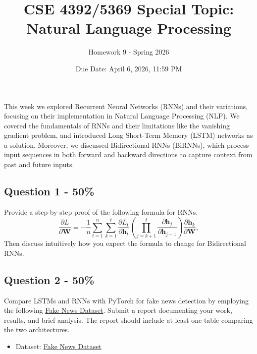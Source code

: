 \documentclass{article}
\begin{document}
\title{CSE 4392/5369 Special Topic: Natural Language Processing}
\author{Homework 9 - Spring 2026}
\date{Due Date: April 6, 2026, 11:59 PM}
\maketitle
\thispagestyle{fancy}


This week we explored Recurrent Neural Networks (RNNs) and their variations, focusing on their implementation in Natural Language Processing (NLP). We covered the fundamentals of RNNs and their limitations like the vanishing gradient problem, and introduced Long Short-Term Memory (LSTM) networks as a solution. Moreover, we discussed Bidirectional RNNs (BiRNNs), which process input sequences in both forward and backward directions to capture context from past and future inputs.

\subsection*{Question 1 - 50\%}
Provide a step-by-step proof of the following formula for RNNs.
$$\frac{\partial L }{\partial \mathbf{W}} = -\frac{1}{n}\sum_{t=1}^{n}\sum_{k=1}^{t}  \frac{\partial L_t }{\partial  \mathbf{h}_t}\left ( \prod_{j=k+1}^{t}  \frac{\partial \mathbf{h}_j  }{\partial  \mathbf{h}_{j-1}} \right ) \frac{\partial \mathbf{h}_k }{\partial \mathbf{W}},$$
Then discuss intuitively how you expect the formula to change for Bidirectional RNNs. 


\subsection*{Question 2 - 50\%}

Compare LSTMs and RNNs with PyTorch for fake news detection by employing the following \href{https://www.kaggle.com/datasets/emineyetm/fake-news-detection-datasets/data}{Fake News Dataset}.
Submit a report documenting your work, results, and brief analysis. The report should include at least one table comparing the two architectures.
\begin{itemize}
    \item Dataset: \href{https://www.kaggle.com/datasets/emineyetm/fake-news-detection-datasets/data}{Fake News Dataset}
\end{itemize}


\vspace{0.8em}
\end{document}
